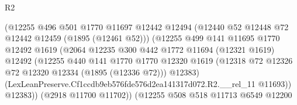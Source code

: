 \begin{lexlean}{R2}
\begin{coremodule}
                                        (@12255
                                          @496
                                          @501
                                          @1770
                                          @11697
                                          @12442
                                          @12494
                                          (@12440 @52 @12448 @72 @12442 @12459 (@1895 (@12461 @52)))
                                          (@12255
                                            @499
                                            @141
                                            @11695
                                            @1770
                                            @12492
                                            @1619
                                            (@2064
                                              @12235
                                              @300
                                              @442
                                              @1772
                                              @11694
                                              (@12321 @1619)
                                              @12492
                                              (@12255
                                                @440
                                                @141
                                                @1770
                                                @1770
                                                @12320
                                                @1619
                                                (@12318
                                                  @72
                                                  @12326
                                                  @72
                                                  @12320
                                                  @12334
                                                  (@1895 (@12336 @72)))
                                                @12383)
                                              (LexLeanPreserve.Cf1ccdb9eb576fde576d2ea141317d072.R2.__rel_11
                                                @11693))
                                            @12383))
                                        (@2918 @11700 @11702))
                                      (@12255
                                        @508
                                        @518
                                        @11713
                                        @6549
                                        @12200

\end{coremodule}
\end{lexlean}
